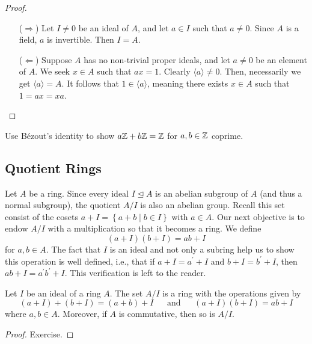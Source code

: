 \documentclass[11pt,a4paper]{article}
\begin{document}
\begin{proof}
\begin{enumerate}[label=(\roman*)]
\item[(\(\Rightarrow\))] Let \( I \neq 0 \) be an ideal of \( A \), and let \( a \in I \) such that \( a \neq 0 \). Since \( A \) is a field, \( a \) is invertible. Then  \( I = A \).
\item[(\(\Leftarrow\))]  Suppose \( A \) has no non-trivial proper ideals, and let \( a \neq 0 \) be an element of \( A \). We seek \( x \in A \) such that \( ax = 1 \). Clearly \(\langle a\rangle \neq 0\). Then, necessarily we get  \( \langle a\rangle = A \). It follows that \( 1 \in \langle a\rangle  \), meaning there exists \( x \in A \) such that \( 1 = ax = xa \).  
\end{enumerate}
\end{proof}

\begin{eje}
    Use Bézout's identity to show \(a\mathbb{Z} + b\mathbb{Z} = \mathbb{Z}\) for \(a,b\in \mathbb{Z}\) coprime.
\end{eje}

\subsection{Quotient Rings}

Let \(A\) be a ring.
Since every ideal \(I\trianglelefteq A\) is an abelian subgroup of \(A\) (and thus a normal subgroup), 
the quotient \(A/I\) is also an abelian group.
Recall this set consist of the cosets \(a + I = \left\{ a + b \mid b\in I \right\}\) with \(a\in A\).
Our next objective is to endow \(A/I\) with a multiplication so that it becomes a ring.
We define 
\[(a+I)(b+I)=a b+I\]
for \(a,b\in A\).
The fact that \(I\) is an ideal and not only  a subring help us to show this operation is well defined, i.e., that if $a+I=a^{\prime}+I$ and  $b+I=b^{\prime}+I$, then $a b+I=a^{\prime} b^{\prime}+I$.
This verification is left to the reader.

\begin{prop}
    Let \(I\) be an ideal of a ring \(A\).
    The set \(A/I\) is a ring with the operations given by 
    \[(a+I)+(b+I)=(a+b)+I\;\quad\text{ and }\;\quad (a+I)(b+I)=a b+I\]
    where \(a,b\in A\).
    Moreover, if \(A\) is commutative, then so is \(A/I\).
\end{prop}

\begin{proof}
    Exercise.
\end{proof}
\end{document}
